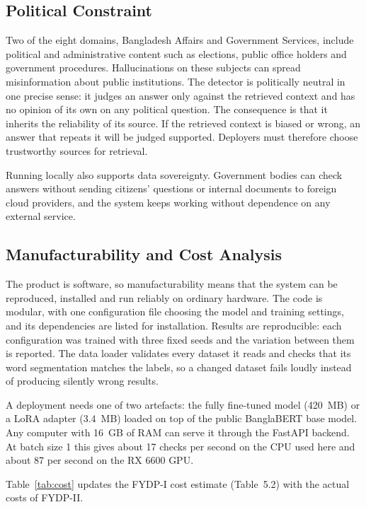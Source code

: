 \subsection{Political Constraint}

Two of the eight domains, Bangladesh Affairs and Government Services, include
political and administrative content such as elections, public office holders
and government procedures. Hallucinations on these subjects can spread
misinformation about public institutions. The detector is politically neutral
in one precise sense: it judges an answer only against the retrieved context
and has no opinion of its own on any political question. The consequence is
that it inherits the reliability of its source. If the retrieved context is
biased or wrong, an answer that repeats it will be judged supported. Deployers
must therefore choose trustworthy sources for retrieval.

Running locally also supports data sovereignty. Government bodies can check
answers without sending citizens' questions or internal documents to foreign
cloud providers, and the system keeps working without dependence on any
external service.

\subsection{Manufacturability and Cost Analysis}

The product is software, so manufacturability means that the system can be
reproduced, installed and run reliably on ordinary hardware. The code is
modular, with one configuration file choosing the model and training settings,
and its dependencies are listed for installation. Results are reproducible:
each configuration was trained with three fixed seeds and the variation between
them is reported. The data loader validates every dataset it reads and checks
that its word segmentation matches the labels, so a changed dataset fails
loudly instead of producing silently wrong results.

A deployment needs one of two artefacts: the fully fine-tuned model (420~MB) or
a LoRA adapter (3.4~MB) loaded on top of the public BanglaBERT base model. Any
computer with 16~GB of RAM can serve it through the FastAPI backend. At batch
size 1 this gives about 17 checks per second on the CPU used here and about 87
per second on the RX 6600 GPU.

Table~\ref{tab:cost} updates the FYDP-I cost estimate (Table~5.2) with the
actual costs of FYDP-II.

